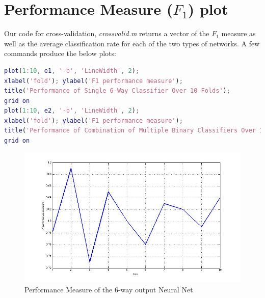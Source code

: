 \documentclass[a4paper,12pt,oneside,final]{report}
\newenvironment{changemargin}[2]{\begin{list}{}{%
\setlength{\topsep}{0pt}%
\setlength{\leftmargin}{0pt}%
\setlength{\rightmargin}{0pt}%
\setlength{\listparindent}{\parindent}%
\setlength{\itemindent}{\parindent}%
\setlength{\parsep}{0pt plus 1pt}%
\addtolength{\leftmargin}{#1}%
\addtolength{\rightmargin}{#2}%
}\item }{\end{list}}
\begin{document}
\section{Performance Measure ($F_1$) plot}
Our code for cross-validation, \textit{crossvalid.m} returns a vector of the $F_1$ measure as well as the average classification rate for each of the two types of networks.  A few commands produce the below plots:
\begin{changemargin}{-5mm}{-5mm}
\begin{lstlisting}[language=Matlab, frame=single]		
plot(1:10, e1, '-b', 'LineWidth', 2);
xlabel('fold'); ylabel('F1 performance measure');
title('Performance of Single 6-Way Classifier Over 10 Folds');
grid on
plot(1:10, e2, '-b', 'LineWidth', 2);
xlabel('fold'); ylabel('F1 performance measure');
title('Performance of Combination of Multiple Binary Classifiers Over 10 Folds');
grid on
\end{lstlisting}
\end{changemargin}


\begin{figure}[!h]
\begin{changemargin}{-20mm}{-20mm}
\center
\includegraphics[scale=0.5]{single_perf.jpg}
\caption{Performance Measure of the 6-way output Neural Net}
\end{changemargin}
\end{figure}
\end{document}
